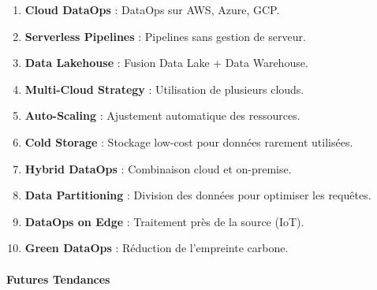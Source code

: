 \documentclass[
  letterpaper,
  DIV=11,
  numbers=noendperiod]{scrartcl}
\makeatletter
\let\oldparagraph\paragraph
\renewcommand{\paragraph}{
    \@ifstar
      \xxxParagraphStar
      \xxxParagraphNoStar
  }
\newcommand{\xxxParagraphStar}[1]{\oldparagraph*{#1}\mbox{}}
\newcommand{\xxxParagraphNoStar}[1]{\oldparagraph{#1}\mbox{}}
\providecommand{\tightlist}{%
  \setlength{\itemsep}{0pt}\setlength{\parskip}{0pt}}\usepackage{longtable,booktabs,array}
\makeatother
\begin{document}
\begin{enumerate}
\def\labelenumi{\arabic{enumi}.}
\setcounter{enumi}{70}
\tightlist
\item
  \textbf{Cloud DataOps} : DataOps sur AWS, Azure, GCP.\\
\item
  \textbf{Serverless Pipelines} : Pipelines sans gestion de serveur.\\
\item
  \textbf{Data Lakehouse} : Fusion Data Lake + Data Warehouse.\\
\item
  \textbf{Multi-Cloud Strategy} : Utilisation de plusieurs clouds.\\
\item
  \textbf{Auto-Scaling} : Ajustement automatique des ressources.\\
\item
  \textbf{Cold Storage} : Stockage low-cost pour données rarement
  utilisées.\\
\item
  \textbf{Hybrid DataOps} : Combinaison cloud et on-premise.\\
\item
  \textbf{Data Partitioning} : Division des données pour optimiser les
  requêtes.\\
\item
  \textbf{DataOps on Edge} : Traitement près de la source (IoT).\\
\item
  \textbf{Green DataOps} : Réduction de l'empreinte carbone.
\end{enumerate}

\paragraph{\texorpdfstring{\textbf{Futures
Tendances}}{Futures Tendances}}\label{futures-tendances-1}
\end{document}
